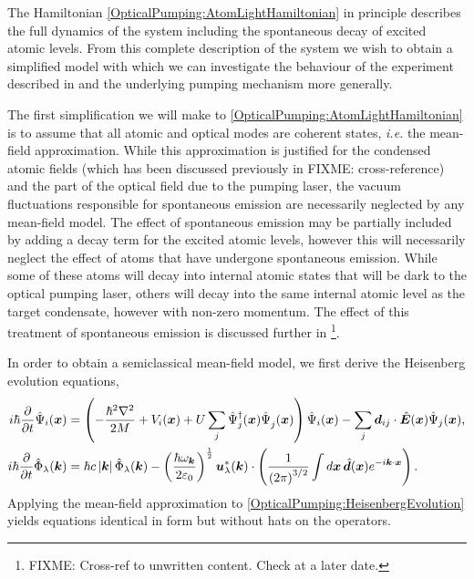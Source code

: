 The Hamiltonian \eqref{OpticalPumping:AtomLightHamiltonian} in principle describes the full dynamics of the system including the spontaneous decay of excited atomic levels.  From this complete description of the system we wish to obtain a simplified model with which we can investigate the behaviour of the experiment described in  and the underlying pumping mechanism more generally.  

The first simplification we will make to \eqref{OpticalPumping:AtomLightHamiltonian} is to assume that all atomic and optical modes are coherent states, \emph{i.e.} the mean-field approximation.  While this approximation is justified for the condensed atomic fields (which has been discussed previously in FIXME: cross-reference) and the part of the optical field due to the pumping laser, the vacuum fluctuations responsible for spontaneous emission are necessarily neglected by any mean-field model.  The effect of spontaneous emission may be partially included by adding a decay term for the excited atomic levels, however this will necessarily neglect the effect of atoms that have undergone spontaneous emission.  While some of these atoms will decay into internal atomic states that will be dark to the optical pumping laser, others will decay into the same internal atomic level as the target condensate, however with non-zero momentum.  The effect of this treatment of spontaneous emission is discussed further in \footnote{FIXME: Cross-ref to unwritten content.  Check at a later date.}.

In order to obtain a semiclassical mean-field model, we first derive the Heisenberg evolution equations,
\begin{subequations}
    \label{OpticalPumping:HeisenbergEvolution}
    \begin{align}
        i \hbar \frac{\partial}{\partial t} \hat{\Psi}_i(\bm{x}) &= \left(- \frac{\hbar^2 \nabla^2}{2 M} + V_i(\bm{x}) + U\sum_j\hat{\Psi}_j^\dagger(\bm{x})\hat{\Psi}_j^{\phantom{\dagger}}(\bm{x})\right)\hat{\Psi}_i(\bm{x}) - \sum_{j} \bm{d}_{ij} \cdot \hat{\bm{E}}(\bm{x}) \hat{\Psi}_j(\bm{x}),\\
        i \hbar \frac{\partial}{\partial t} \hat{\Phi}_\lambda(\bm{k}) &= \hbar c \abs{\bm{k}} \hat{\Phi}_\lambda(\bm{k}) - \left(\frac{\hbar \omega_{\bm{k}}}{2 \varepsilon_0}\right)^{\frac{1}{2}} \bm{u}_\lambda^*(\bm{k}) \cdot \left( \frac{1}{\left(2\pi\right)^{3/2}} \int d \bm{x}\, \hat{\bm{d}}(\bm{x}) e^{-i \bm{k} \cdot \bm{x}} \right).
    \end{align}
\end{subequations}
Applying the mean-field approximation to \eqref{OpticalPumping:HeisenbergEvolution} yields equations identical in form but without hats on the operators.

